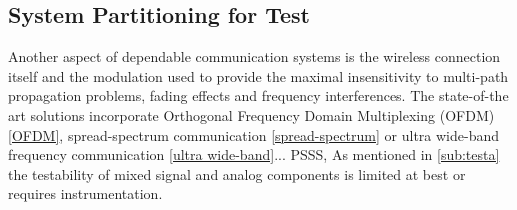 \subsection{System Partitioning for Test}
Another aspect of dependable communication systems is the wireless connection itself and the modulation used to provide the maximal insensitivity to multi-path propagation problems, fading effects and frequency interferences. The state-of-the art solutions incorporate Orthogonal Frequency Domain Multiplexing (OFDM) \ref{OFDM}, spread-spectrum communication \ref{spread-spectrum} or ultra wide-band frequency communication \ref{ultra wide-band}...
PSSS, 
 As mentioned in \autoref{sub:testa} the testability of mixed signal and analog components is limited at best or requires instrumentation. 
